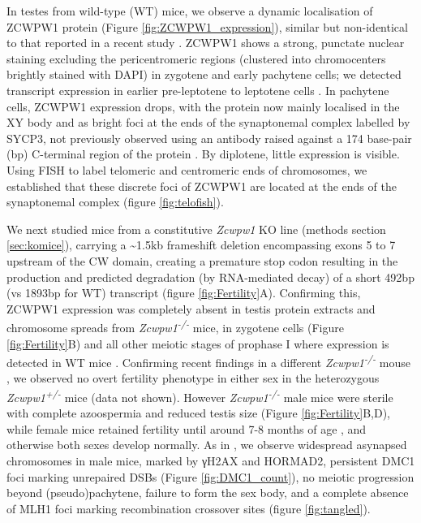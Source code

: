 In testes from wild-type (WT) mice, we observe a dynamic localisation of ZCWPW1 protein (Figure \ref{fig:ZCWPW1_expression}), similar but non-identical to that reported in a recent study \parencite{Li2019histone}.
ZCWPW1 shows a strong, punctate nuclear staining excluding the pericentromeric regions (clustered into chromocenters brightly stained with DAPI) in zygotene and early pachytene cells; we detected transcript expression in earlier pre-leptotene to leptotene cells \parencite{Jung2019Unified}.
In pachytene cells, ZCWPW1 expression drops, with the protein now mainly localised in the XY body and as bright foci at the ends of the synaptonemal complex labelled by SYCP3, not previously observed using an antibody raised against a 174 base-pair (bp) C-terminal region of the protein \parencite{Li2019histone}.
By diplotene, little expression is visible.
Using FISH to label telomeric and centromeric ends of chromosomes, we established that these discrete foci of ZCWPW1 are located at the ends of the synaptonemal complex (figure \ref{fig:telofish}).

We next studied mice from a constitutive \textit{Zcwpw1} KO line (methods section \ref{sec:komice}), carrying a \textasciitilde1.5kb frameshift deletion encompassing exons 5 to 7 upstream of the CW domain, creating a premature stop codon resulting in the production and predicted degradation (by RNA-mediated decay) of a short 492bp (vs 1893bp for WT) transcript (figure \ref{fig:Fertility}A).
Confirming this, ZCWPW1 expression was completely absent in testis protein extracts \iffalse supp fig \fi and chromosome spreads from \textit{Zcwpw1\textsuperscript{-/-}} mice, in zygotene cells (Figure \ref{fig:Fertility}B) and all other meiotic stages of prophase I where expression is detected in WT mice \iffalse supp fig \fi.
Confirming recent findings in a different \textit{Zcwpw1\textsuperscript{-/-}} mouse \parencite{Li2019histone}, we observed no overt fertility phenotype in either sex in the heterozygous \textit{Zcwpw1\textsuperscript{+/-}} mice (data not shown).
However \textit{Zcwpw1\textsuperscript{-/-}} male mice were sterile with complete azoospermia and reduced testis size (Figure \ref{fig:Fertility}B,D), while female mice retained fertility until around 7-8 months of age \iffalse supp table \fi, and otherwise both sexes develop normally.
As in \cite{Li2019histone}, we observe widespread asynapsed chromosomes in male mice, marked by γH2AX and HORMAD2, persistent DMC1 foci marking unrepaired DSBs (Figure \ref{fig:DMC1_count}), no meiotic progression beyond (pseudo)pachytene, failure to form the sex body, and a complete absence of MLH1 foci marking recombination crossover sites (figure \ref{fig:tangled}).

